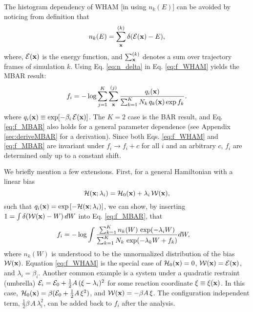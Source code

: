 \documentclass[reprint,aip,jcp,superscriptaddress]{revtex4-1}
\begin{document}
{
The histogram dependency of WHAM
[in using $n_k(E)$]
can be avoided
by noticing from definition that\cite{
souaille2001}
}
%
\begin{equation}
n_k(E)
=
\sum_{\mathbf{x}}^{(k)} \delta(\mathcal{E}(\mathbf{x}) - E),
\label{eq:n_delta}
\end{equation}
%
where,
$\mathcal{E}(\mathbf{x})$
is the energy function,
and
$\sum_{\mathbf{x}}^{(k)}$
denotes a sum over trajectory frames
of simulation $k$.
%
%
%
Using Eq. \eqref{eq:n_delta}
in Eq. \eqref{eq:f_WHAM} yields
the MBAR result\cite{
kumar1992, souaille2001, shirts2008}:
%
\begin{equation}
f_i
=
-\log
\sum_{j = 1}^K
\sum_{\mathbf{x}}^{(j)}
\frac{
  q_i(\mathbf{x})
}
{
  \sum_{k = 1}^K N_k \, q_k(\mathbf{x}) \exp f_k
}.
\label{eq:f_MBAR}
\end{equation}
%
where
$q_i(\mathbf{x}) \equiv \exp[ -\beta_i \, \mathcal{E}(\mathbf{x}) ]$.
%
The $K = 2$ case is the BAR result\cite{
bennett1976},
and Eq. \eqref{eq:f_MBAR}
also holds for a general parameter dependence
(see Appendix \ref{sec:deriveMBAR}
for a derivation).
%
Since both Eqs. \eqref{eq:f_WHAM} and \eqref{eq:f_MBAR}
are invariant under $f_i \rightarrow f_i + c$
for all $i$ and an arbitrary $c$,
$f_i$ are determined only up to a constant shift.



We briefly mention a few extensions.
%
First,
for a general Hamiltonian
with a linear bias
\[
\mathcal{H}(\mathbf{x}; \lambda_i) = \mathcal{H}_0(\mathbf{x}) + \lambda_i \, \mathcal{W}(\mathbf{x}),
\]
such that $q_i(\mathbf{x}) = \exp\left[ -\mathcal{H}(\mathbf{x}; \lambda_i) \right]$,
%
we can show,
by inserting
$1 = \int \delta(\mathcal{W}(\mathbf{x}) - W) \, dW$
into Eq. \eqref{eq:f_MBAR},
that
%
\begin{align}
f_i
&=
-\log
  \int
    \frac{
      \sum_{k = 1}^K n_k(W) \, \exp(-\lambda_i W)
    }
    {
      \sum_{k = 1}^K N_k \, \exp(-\lambda_k W + f_k)
    }
    d W,
\notag
\end{align}
%
where
$n_k(W)$
is understood to be
the unnormalized distribution of
the bias $\mathcal{W}(\mathbf{x})$.
%
Equation \eqref{eq:f_WHAM}
is the special case of
$\mathcal{H}_0(\mathbf{x}) = 0$,
$\mathcal{W}(\mathbf{x}) = \mathcal{E}(\mathbf{x})$,
and $\lambda_i = \beta_i$.
%
Another common example
is a system under a quadratic restraint (umbrella)
$\mathcal{E}_i = \mathcal{E}_0 + \frac 1 2 A \, (\xi - \lambda_i)^2$
for some reaction coordinate $\xi \equiv \xi(\mathbf{x})$.
%
In this case,
$\mathcal{H}_0(\mathbf{x}) = \beta (\mathcal{E}_0 + \frac 1 2 A \, \xi^2)$,
and
$\mathcal{W}(\mathbf{x}) = -\beta A \, \xi$.
%
The configuration independent term,
$\frac 1 2 \beta \, A \, \lambda_i^2$,
can be added back to $f_i$ after the analysis.
\end{document}
